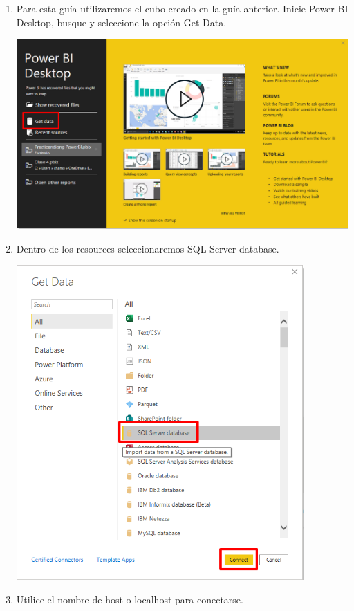 \documentclass{article}
\begin{document}
\begin{enumerate}[\tab 1.]
        \item Para esta guía utilizaremos el cubo creado en la guía anterior. Inicie Power BI Desktop, busque y seleccione la opción Get Data.
        \begin{center}
            \includegraphics[width=13cm]{./images/1.png}
        \end{center}
        \newpage
        \item Dentro de los resources seleccionaremos SQL Server database.
        \begin{center}
            \includegraphics[width=11cm]{./images/2.png}
            \newpage
        \end{center}
        \item Utilice el nombre de host o localhost para conectarse.

\end{enumerate}
\end{document}
